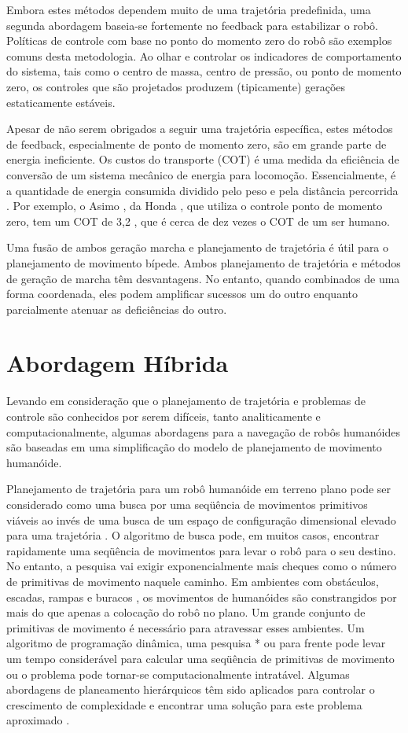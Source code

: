 \documentclass[font=plain]{abnt}
\begin{document}
Embora estes métodos dependem muito de uma trajetória predefinida, uma segunda abordagem baseia-se fortemente no feedback para 
estabilizar o robô. Políticas de controle com base no ponto do momento zero  do robô \cite{pkajita} \cite{pnagasaka} são exemplos comuns 
desta metodologia. Ao olhar e controlar os indicadores de comportamento do sistema, tais como o centro de massa, centro de pressão, 
ou ponto de momento zero, os controles que são projetados produzem (tipicamente) gerações estaticamente estáveis.

Apesar de não serem obrigados a seguir uma trajetória específica, estes métodos de feedback, especialmente de ponto de momento zero,
são em grande parte de energia ineficiente. Os custos do transporte (COT) é uma medida da eficiência de conversão de um sistema 
mecânico de energia para locomoção. Essencialmente, é a quantidade de energia consumida dividido pelo peso e pela distância percorrida
\cite{bkuo}. Por exemplo, o Asimo , da Honda , que utiliza o controle ponto de momento zero, tem um COT de 3,2 , que é 
cerca de dez vezes o COT de um ser humano.

Uma fusão de ambos geração marcha e planejamento de trajetória é útil para o planejamento de movimento bípede. Ambos planejamento de 
trajetória e métodos de geração de marcha têm desvantagens. No entanto, quando combinados de uma forma coordenada, eles podem amplificar 
sucessos um do outro enquanto parcialmente atenuar as deficiências do outro.

\section{Abordagem H\'ibrida}
Levando em considera\c{c}\~ao que o planejamento de trajet\'oria e problemas de controle s\~ao conhecidos por serem dif\'iceis, 
tanto analiticamente e computacionalmente, algumas abordagens para a navega\c{c}\~ao de rob\^os human\'oides s\~ao baseadas em 
uma simplifica\c{c}\~ao do modelo de planejamento de movimento human\'oide.

Planejamento de trajetória para um robô humanóide em terreno plano pode ser considerado como uma busca por uma seqüência de movimentos
primitivos vi\'aveis ao inv\'es de uma busca de um espa\c {c}o de configura\c{c}\~ao dimensional elevado para uma trajetória \cite{bkuffner}. 
O algoritmo de busca pode, em muitos casos, encontrar rapidamente uma seqüência de movimentos para levar o robô para o seu destino. No entanto,
a pesquisa vai exigir exponencialmente mais cheques como o número de primitivas de movimento naquele caminho. Em ambientes com obstáculos, 
escadas, rampas e buracos , os movimentos de humanóides são constrangidos por mais do que apenas a colocação do robô no plano. Um grande 
conjunto de primitivas de movimento é necessário para atravessar esses ambientes. Um algoritmo de programação dinâmica, uma pesquisa * ou
para frente pode levar um tempo considerável para calcular uma seqüência de primitivas de movimento ou o problema pode tornar-se 
computacionalmente intratável. Algumas abordagens de planeamento hierárquicos têm sido aplicados para controlar o crescimento de complexidade 
e encontrar uma solução para este problema aproximado \cite{pchesnutt}.
\end{document}
